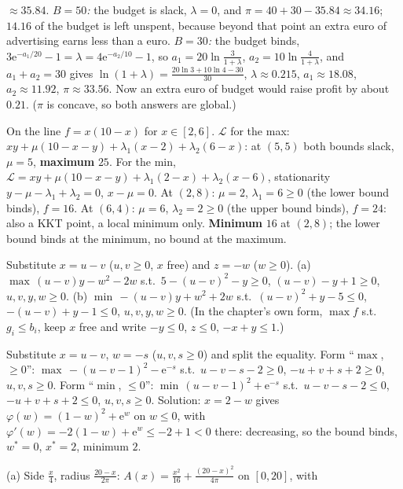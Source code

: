 \begin{solutions}
        $\approx35.84$. \emph{$B=50$:} the budget is slack, $\lambda=0$, and
        $\pi=40+30-35.84\approx34.16$; $14.16$ of the budget is left
        unspent, because beyond that point an extra euro of advertising
        earns less than a euro. \emph{$B=30$:} the budget binds,
        $3\mathrm{e}^{-a_1/20}-1=\lambda=4\mathrm{e}^{-a_2/10}-1$, so
        $a_1=20\ln\tfrac{3}{1+\lambda}$, $a_2=10\ln\tfrac{4}{1+\lambda}$, and
        $a_1+a_2=30$ gives $\ln(1+\lambda)=\tfrac{20\ln3+10\ln4-30}{30}$,
        $\lambda\approx0.215$, $a_1\approx18.08$, $a_2\approx11.92$,
        $\pi\approx33.56$. Now an extra euro of budget would raise profit by
        about $0.21$. ($\pi$ is concave, so both answers are global.)
  \item On the line $f=x(10-x)$ for $x\in[2,6]$. $\mathcal{L}$ for the max:
        $xy+\mu(10-x-y)+\lambda_1(x-2)+\lambda_2(6-x)$: at $(5,5)$ both
        bounds slack, $\mu=5$, \textbf{maximum} $25$. For the min,
        $\mathcal{L}=xy+\mu(10-x-y)+\lambda_1(2-x)+\lambda_2(x-6)$,
        stationarity $y-\mu-\lambda_1+\lambda_2=0$, $x-\mu=0$. At $(2,8)$:
        $\mu=2$, $\lambda_1=6\ge0$ (the lower bound binds), $f=16$. At
        $(6,4)$: $\mu=6$, $\lambda_2=2\ge0$ (the upper bound binds), $f=24$:
        also a KKT point, a local minimum only. \textbf{Minimum} $16$ at
        $(2,8)$; the lower bound binds at the minimum, no bound at the
        maximum.
  \item Substitute $x=u-v$ ($u,v\ge0$, $x$ free) and $z=-w$ ($w\ge0$).
        (a) $\max\,(u-v)y-w^{2}-2w$ s.t.\ $5-(u-v)^{2}-y\ge0$,
        $(u-v)-y+1\ge0$, $u,v,y,w\ge0$.
        (b) $\min\,-(u-v)y+w^{2}+2w$ s.t.\ $(u-v)^{2}+y-5\le0$,
        $-(u-v)+y-1\le0$, $u,v,y,w\ge0$.
        (In the chapter's own form, $\max f$ s.t.\ $g_i\le b_i$, keep
        $x$ free and write $-y\le0$, $z\le0$, $-x+y\le1$.)
  \item Substitute $x=u-v$, $w=-s$ ($u,v,s\ge0$) and split the equality.
        Form ``$\max$, $\ge0$'': $\max\,-(u-v-1)^{2}-\mathrm{e}^{-s}$ s.t.\
        $u-v-s-2\ge0$, $-u+v+s+2\ge0$, $u,v,s\ge0$. Form ``$\min$, $\le0$'':
        $\min\,(u-v-1)^{2}+\mathrm{e}^{-s}$ s.t.\ $u-v-s-2\le0$,
        $-u+v+s+2\le0$, $u,v,s\ge0$. Solution: $x=2-w$ gives
        $\varphi(w)=(1-w)^{2}+\mathrm{e}^{w}$ on $w\le0$, with
        $\varphi'(w)=-2(1-w)+\mathrm{e}^{w}\le-2+1<0$ there: decreasing, so
        the bound binds, $w^*=0$, $x^*=2$, minimum $2$.
  \item (a) Side $\tfrac x4$, radius $\tfrac{20-x}{2\pi}$:
        $A(x)=\tfrac{x^{2}}{16}+\tfrac{(20-x)^{2}}{4\pi}$ on $[0,20]$, with

\end{solutions}
